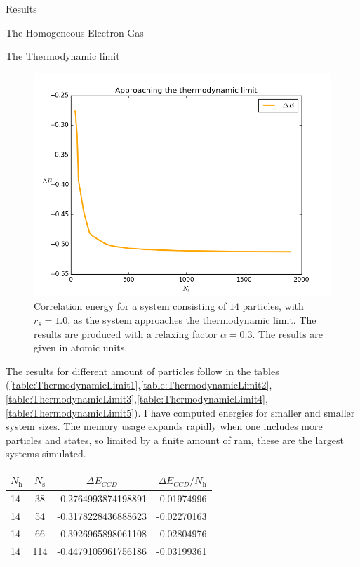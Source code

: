 \documentclass[twoside,english]{uiofysmaster}
\begin{document}
\begin{chapter}{Results}
\begin{section}{The Homogeneous Electron Gas}
\begin{subsection}{The Thermodynamic limit}
			\begin{figure}[H]
				\includegraphics[width=\textwidth]{../ElectronGas/Results/Figures/Thermodynamic_limit.png}
				\caption{Correlation energy for a system consisting of $14$ particles, with $r_s=1.0$, as the system approaches the thermodynamic limit. The results are produced with a relaxing factor $\alpha=0.3$. The results are given in atomic units.}
				\label{figure:thermodynamic_limit}
			\end{figure}
			The results for different amount of particles follow in the tables \newline (\ref{table:ThermodynamicLimit1},\ref{table:ThermodynamicLimit2},\ref{table:ThermodynamicLimit3},\ref{table:ThermodynamicLimit4},\ref{table:ThermodynamicLimit5}). I have computed energies for smaller and smaller system sizes. The memory usage expands rapidly when one includes more particles and states, so limited by a finite amount of ram, these are the largest systems simulated.  
			\begin{table}[H]
				\begin{center}
					\begin{tabular}[center]{l  c  c r}
						$N_{\text{h}}$ & $N_{\text{s}}$ & $\Delta E_{CCD}$ & $\Delta E_{CCD}/N_{\text{h}}$ \\
						\hline
						14 &  38 & -0.2764993874198891 & -0.01974996 \\
						14 &  54 & -0.3178228436888623 & -0.02270163\\ 
						14 &  66 & -0.3926965898061108 & -0.02804976\\
						14 & 114 & -0.4479105961756186 & -0.03199361 \\

\end{tabular}
\end{center}
\end{table}
\end{subsection}
\end{section}
\end{chapter}
\end{document}

